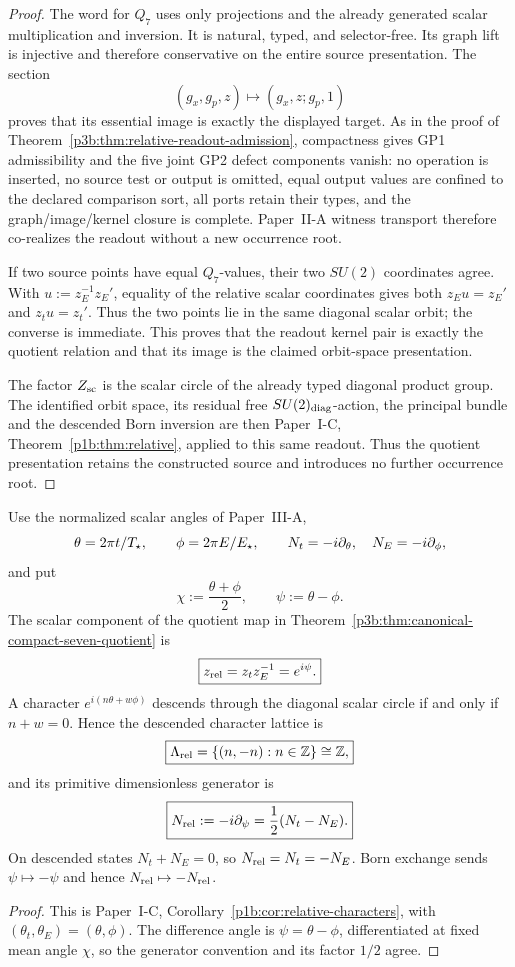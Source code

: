 \documentclass[12pt,a4paper]{article}
\begin{document}
\begin{proof}
The word for \(Q_7\) uses only projections and the already generated scalar
multiplication and inversion.  It is natural, typed, and selector-free.  Its
graph lift is injective and therefore conservative on the entire source
presentation.  The section
\[
 (g_x,g_p,z)\longmapsto(g_x,z;g_p,1)
\]
proves that its essential image is exactly the displayed target.  As in the
proof of Theorem~\ref{p3b:thm:relative-readout-admission}, compactness gives
GP1 admissibility and the five joint GP2 defect components vanish: no
operation is inserted, no source test or output is omitted, equal output
values are confined to the declared comparison sort, all ports retain their
types, and the graph/image/kernel closure is complete.  Paper~II-A witness
transport therefore co-realizes the readout without a new occurrence root.

If two source points have equal \(Q_7\)-values, their two \(SU(2)\)
coordinates agree.  With \(u:=z_E^{-1}z_E'\), equality of the relative scalar
coordinates gives both \(z_Eu=z_E'\) and \(z_tu=z_t'\).  Thus the two points
lie in the same diagonal scalar orbit; the converse is immediate.  This
proves that the readout kernel pair is exactly the quotient relation and that
its image is the claimed orbit-space presentation.

The factor \(Z_{\rm sc}\) is the scalar circle of the already typed
diagonal product group.  The identified orbit space, its residual free
\(SU(2)_{\rm diag}\)-action, the principal bundle and the descended Born
inversion are then Paper~I-C, Theorem~\ref{p1b:thm:relative}, applied to
this same readout.  Thus the quotient presentation retains the constructed
source and introduces no further occurrence root.
\end{proof}


\begin{corollary}
\label{p3b:cor:v181-relative-scalar-generator}
Use the normalized scalar angles of Paper~III-A,
\[
 \theta=2\pi t/T_\star,\qquad \phi=2\pi E/E_\star,
 \qquad
 N_t=-i\partial_\theta,\quad N_E=-i\partial_\phi,
\]
and put
\[
 \chi:=\frac{\theta+\phi}{2},\qquad \psi:=\theta-\phi.
\]
The scalar component of the quotient map in
Theorem~\ref{p3b:thm:canonical-compact-seven-quotient} is
\[
 \boxed{z_{\rm rel}=z_tz_E^{-1}=e^{i\psi}.}
\]
A character $e^{i(n\theta+w\phi)}$ descends through the diagonal scalar
circle if and only if $n+w=0$.  Hence the descended character lattice is
\[
 \boxed{\Lambda_{\rm rel}=\{(n,-n):n\in\mathbb Z\}\cong\mathbb Z,}
\]
and its primitive dimensionless generator is
\[
 \boxed{N_{\rm rel}:=-i\partial_\psi=\frac12(N_t-N_E).}
\]
On descended states $N_t+N_E=0$, so
$N_{\rm rel}=N_t=-N_E$.  Born exchange sends $\psi\mapsto-\psi$ and hence
$N_{\rm rel}\mapsto-N_{\rm rel}$.
\end{corollary}
\begin{proof}
This is Paper~I-C, Corollary~\ref{p1b:cor:relative-characters}, with
\((\theta_t,\theta_E)=(\theta,\phi)\).  The difference angle is
\(\psi=\theta-\phi\), differentiated at fixed mean angle \(\chi\), so
the generator convention and its factor \(1/2\) agree.
\end{proof}
\end{document}
